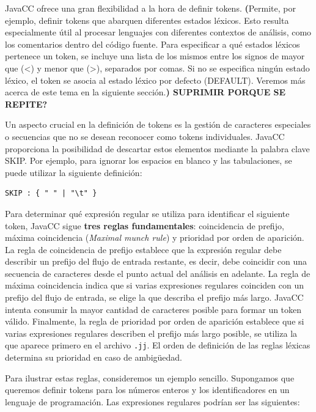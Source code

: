 JavaCC ofrece una gran flexibilidad a la hora de definir tokens. \textbf{(}Permite, por ejemplo, definir tokens que abarquen diferentes estados léxicos. Esto resulta especialmente útil al procesar lenguajes con diferentes contextos de análisis, como los comentarios dentro del código fuente. Para especificar a qué estados léxicos pertenece un token, se incluye una lista de los mismos entre los signos de mayor que (<) y menor que (>), separados por comas. Si no se especifica ningún estado léxico, el token se asocia al estado léxico por defecto (DEFAULT). Veremos más acerca de este tema en la siguiente sección.\textbf{) SUPRIMIR PORQUE SE REPITE?}

Un aspecto crucial en la definición de tokens es la gestión de caracteres especiales o secuencias que no se desean reconocer como tokens individuales. JavaCC proporciona la posibilidad de descartar estos elementos mediante la palabra clave SKIP. Por ejemplo, para ignorar los espacios en blanco y las tabulaciones, se puede utilizar la siguiente definición:

\lstset{inputencoding=utf8/latin1}
\begin{lstlisting}
SKIP : { " " | "\t" }
\end{lstlisting}

Para determinar qué expresión regular se utiliza para identificar el siguiente token, JavaCC sigue \textbf{tres reglas fundamentales}: coincidencia de prefijo, máxima coincidencia (\textit{Maximal munch rule}) y prioridad por orden de aparición. La regla de coincidencia de prefijo establece que la expresión regular debe describir un prefijo del flujo de entrada restante, es decir, debe coincidir con una secuencia de caracteres desde el punto actual del análisis en adelante. La regla de máxima coincidencia indica que si varias expresiones regulares coinciden con un prefijo del flujo de entrada, se elige la que describa el prefijo más largo. JavaCC intenta consumir la mayor cantidad de caracteres posible para formar un token válido. Finalmente, la regla de prioridad por orden de aparición establece que si varias expresiones regulares describen el prefijo más largo posible, se utiliza la que aparece primero en el archivo \lstinline|.jj|. El orden de definición de las reglas léxicas determina su prioridad en caso de ambigüedad.

Para ilustrar estas reglas, consideremos un ejemplo sencillo. Supongamos que queremos definir tokens para los números enteros y los identificadores en un lenguaje de programación. Las expresiones regulares podrían ser las siguientes:

